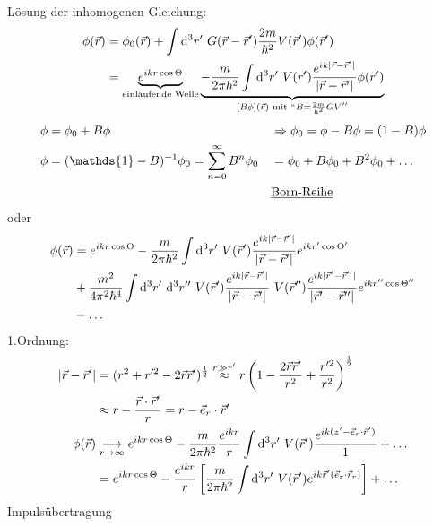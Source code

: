 	Lösung der inhomogenen Gleichung:
		\begin{align*}
			\phi(\vec{r}) &= \phi_0 (\vec{r}) + 
			\int \diff^3 r' ~G(\vec{r} - \vec{r}') \frac{2m}{\hbar^2} V(\vec{r}') \phi (\vec{r}') \\
			&= \underbrace{e^{ikr \cos \Theta}}_{\substack{\text{einlaufende Welle}}}
			\underbrace{- \frac{m}{2 \pi \hbar^2} \int \diff^3 r' ~V(\vec{r}') 
			\frac{e^{ik |\vec{r} - \vec{r}'|}}{|\vec{r} - \vec{r}'|} \phi (\vec{r}')}_{\mathclap{[
				B\phi] (\vec{r}) \text{ mit } ``B=\frac{2m}{\hbar^2} GV''}} 
		\end{align*}
		\begin{align*}
			\phi &= \phi_0 + B \phi &
			&\Rightarrow \phi_0 = \phi - B \phi = (1 - B) \phi \\
			\phi &= (\mathds{1} - B)^{-1} \phi_0 = \sum_{n = 0}^{\infty} B^n \phi_0 &
			&= \phi_0 + B \phi_0 + B^2 \phi_0 + \ldots \\
			& & &\text{\underline{Born-Reihe}}
		\end{align*}
	oder
		\begin{align*}
			\phi (\vec{r}) &= e^{ikr \cos \Theta}
			- \frac{m}{2 \pi \hbar^2} \int \mathrm{d}^3 r' ~V(\vec{r}') 
			\frac{e^{ik |\vec{r} - \vec{r}'|}}{|\vec{r} - \vec{r}'|}
			e^{ikr' \cos \Theta'} \\
			&+ \frac{m^2}{4 \pi^2 \hbar^4} \int \mathrm{d}^3 r' ~\mathrm{d}^3 r'' 
			~V(\vec{r}') 
			\frac{e^{ik |\vec{r} - \vec{r}'|}}{|\vec{r} - \vec{r}'|}
			~V(\vec{r}'') 
			\frac{e^{ik |\vec{r}' - \vec{r}''|}}{|\vec{r}' - \vec{r}''|}
			e^{ikr'' \cos \Theta''} \\
			&- \ldots
		\end{align*}
	1.Ordnung:
		\begin{align*}
			|\vec{r} - \vec{r}'| &= (r^2+r'^2 - 2 \vec{r} \vec{r}')^{\frac{1}{2}} 
			\overset{r \gg r'}{\approx}
			r \left(1 - \frac{2 \vec{r} \vec{r}'}{r^2} + \frac{r'^2}{r^2}\right)^{\frac{1}{2}}\\
			&\approx r - \frac{\vec{r} \cdot \vec{r}'}{r} = r - \vec{e}_r \cdot \vec{r}'\\
			\phi (\vec{r}) &\underset{r\rightarrow \infty}{\longrightarrow} 
			e^{ikr \cos \Theta} 
			- \frac{m}{2 \pi \hbar^2} \frac{e^{ikr}}{r}
			\int \mathrm{d}^3 r' ~V(\vec{r}') 
			\frac{e^{ik (z' - \vec{e}_r \cdot \vec{r}')}}{1} + \ldots \\
			&= e^{ikr \cos \Theta} - \frac{e^{ikr}}{r}
			\left[ \frac{m}{2 \pi \hbar^2} \int \mathrm{d}^3 r' ~V(\vec{r}') 
				e^{ik \vec{r}' (\vec{e}_r \cdot \vec{r}_r)} 
			\right] + \ldots
		\end{align*}
	Impulsübertragung
	
